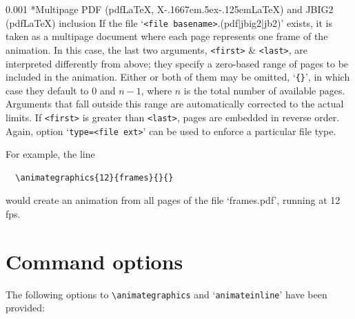 \documentclass[a4paper]{article}
\makeatletter
\newcommand\myparagraph{\@startsection{paragraph}{3}{\z@}%
                                     {\parskip}%
                                     {0.001\parskip}%
                                     {\itshape\normalsize}}
\def\XeLaTeX{X\kern-.1667em\lower.5ex\hbox{\reflectbox{E}}\kern-.125em\LaTeX}
\makeatother
\begin{document}
\myparagraph*{Multipage PDF {\rm(pdf\LaTeX, \XeLaTeX)} and JBIG2 {\rm(pdf\LaTeX)} inclusion}
If the file `\verb+<file basename>+.(pdf|jbig2|jb2)' exists, it is taken as a multipage document where each page represents one frame of the animation. In this case, the last two arguments, \verb+<first>+ \& \verb+<last>+, are interpreted differently from above; they specify a zero-based range of pages to be included in the animation. Either or both of them may be omitted, `\verb+{}+', in which case they default to $0$ and $n-1$, where $n$ is the total number of available pages. Arguments that fall outside this range are automatically corrected to the actual limits. If \verb+<first>+ is greater than \verb+<last>+, pages are embedded in reverse order. Again, option `\verb+type=<file ext>+' can be used to enforce a particular file type.

For example, the line
\begin{verbatim}
  \animategraphics{12}{frames}{}{}
\end{verbatim}
would create an animation from all pages of the file `frames.pdf', running at 12 fps.

\section{Command options}
The following options to \verb+\animategraphics+ and `\verb+animateinline+' have been provided:
\end{document}
